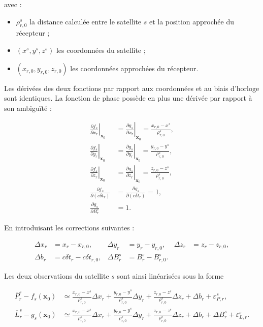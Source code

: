 avec :

\begin{itemize}
    \item $\rho_{r,0}^s$ la distance calculée entre le satellite $s$ et la
    position approchée du récepteur ;
    \item $(x^s,y^s,z^s)$ les coordonnées du satellite ;
    \item $(x_{r,0},y_{r,0},z_{r,0})$ les coordonnées approchées du
    récepteur.
\end{itemize}

Les dérivées des deux fonctions par rapport aux coordonnées et au biais
d'horloge sont identiques. La fonction de phase possède en plus une dérivée
par rapport à son ambiguïté :

\begin{align}
\left.\frac{\partial f_s}{\partial x_r}\right|_{\mathbf x_0}
&=
\left.\frac{\partial g_s}{\partial x_r}\right|_{\mathbf x_0}
=\frac{x_{r,0}-x^s}{\rho_{r,0}^s},
\\
\left.\frac{\partial f_s}{\partial y_r}\right|_{\mathbf x_0}
&=
\left.\frac{\partial g_s}{\partial y_r}\right|_{\mathbf x_0}
=\frac{y_{r,0}-y^s}{\rho_{r,0}^s},
\\
\left.\frac{\partial f_s}{\partial z_r}\right|_{\mathbf x_0}
&=
\left.\frac{\partial g_s}{\partial z_r}\right|_{\mathbf x_0}
=\frac{z_{r,0}-z^s}{\rho_{r,0}^s},
\\
\frac{\partial f_s}{\partial(c\delta t_r)}
&=
\frac{\partial g_s}{\partial(c\delta t_r)}=1,
\\
\frac{\partial g_s}{\partial B_r^s}
&=1.
\label{ann:eq:component_observation_derivatives}
\end{align}


En introduisant les corrections suivantes :

\begin{align}
\Delta x_r&=x_r-x_{r,0},
&
\Delta y_r&=y_r-y_{r,0},
&
\Delta z_r&=z_r-z_{r,0},
\\
\Delta b_r&=c\delta t_r-c\delta t_{r,0},
&
\Delta B_r^s&=B_r^s-B_{r,0}^s.
\label{ann:eq:state_component_corrections}
\end{align}

Les deux observations du satellite $s$ sont ainsi linéarisées sous la forme

\begin{align}
\overline P_r^s-f_s(\mathbf x_0)
&\simeq
\frac{x_{r,0}-x^s}{\rho_{r,0}^s}\Delta x_r
+\frac{y_{r,0}-y^s}{\rho_{r,0}^s}\Delta y_r
+\frac{z_{r,0}-z^s}{\rho_{r,0}^s}\Delta z_r
+\Delta b_r+\varepsilon_{P,r}^s,
\\
\overline L_r^s-g_s(\mathbf x_0)
&\simeq
\frac{x_{r,0}-x^s}{\rho_{r,0}^s}\Delta x_r
+\frac{y_{r,0}-y^s}{\rho_{r,0}^s}\Delta y_r
+\frac{z_{r,0}-z^s}{\rho_{r,0}^s}\Delta z_r
+\Delta b_r+\Delta B_r^s+\varepsilon_{L,r}^s.
\label{ann:eq:component_linearized_observations}
\end{align}

